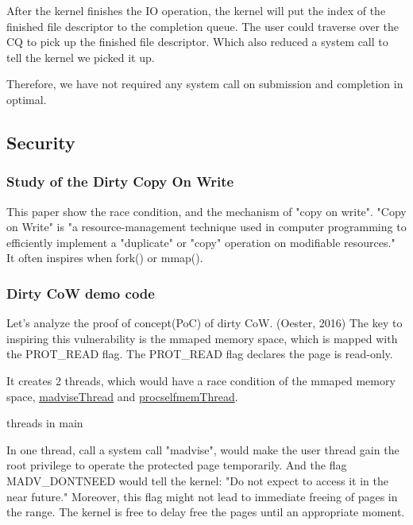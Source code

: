 \documentclass[12pt,a4paper]{IEEEconf}
\begin{document}
After the kernel finishes the IO operation, the kernel will put the index of the finished
file descriptor to the completion queue. The user could traverse over the CQ to pick up
the finished file descriptor. Which also reduced a system call to tell the kernel we picked
it up.

Therefore, we have not required any system call on submission and completion in optimal.

\subsection{Security}
\hypertarget{security}{}
\subsubsection{Study of the Dirty Copy On Write}
This paper\cite{Study_Dirty_Cow} show the race condition, and the mechanism of
"copy on write". "Copy on Write" is "a resource-management technique used in
computer programming to efficiently implement a "duplicate" or "copy" operation
on modifiable resources." \cite{CoW_wiki} It often inspires when fork() or mmap().

\subsubsection{Dirty CoW demo code}
Let's analyze the proof of concept(PoC) of dirty CoW. (Oester, 2016)\cite{Dirty_CoW}
The key to inspiring this vulnerability is the mmaped memory space, which is mapped with
the PROT\_READ flag. The PROT\_READ flag declares the page is read-only.


It creates 2 threads, which would have a race condition of the mmaped memory space,
\hyperlink{madvise}{madviseThread} and \hyperlink{procself}{procselfmemThread}.

\hypertarget{threads_main}{threads in main}


In one thread, call a system call "madvise", would make the user thread gain the root
privilege to operate the protected page temporarily. And the flag MADV\_DONTNEED would
tell the kernel: "Do not expect to access it in the near future.\cite{Madvise}" Moreover,
this flag might not lead to immediate freeing of pages in the range. The kernel is free
to delay free the pages until an appropriate moment.\cite{Madvise}
\end{document}
